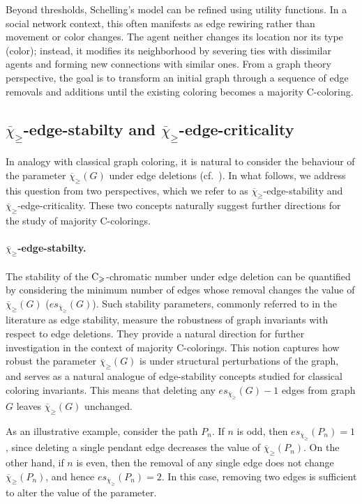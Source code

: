 \documentclass{article}
\theoremstyle{definition}
\newcommand{\mc}{\overline{\chi}_{\geqslant}}
\newcommand{\cg}{{\rm C}_{\geqslant}}
\begin{document}
    Beyond thresholds, Schelling's model can be refined using utility functions. In a social network context, this often manifests as edge rewiring rather than movement or color changes.
The agent neither changes its location nor its type (color); instead, it modifies its neighborhood by severing ties with dissimilar agents and forming new connections with similar ones. 
From a graph theory perspective, the goal is to transform an initial graph through a sequence of edge removals and additions until the existing coloring becomes a majority C-coloring.


\subsection{$\mc$-edge-stabilty and $\mc$-edge-criticality }
In analogy with classical graph coloring, it is natural to consider the behaviour of the parameter $\mc(G)$ under edge deletions (cf.~\cite{edge-stab}). In what follows, we address this question from two perspectives, which we refer to as $\mc$-edge-stability and $\mc$-edge-criticality. These two concepts naturally suggest further directions for the study of majority C-colorings.

\paragraph{$\mc$-edge-stabilty.} The stability of the $\cg$-chromatic number under edge deletion can be quantified by considering the minimum number of edges whose removal changes the value of $\mc(G)$ ($es_{\mc}(G)$). Such stability parameters, commonly referred to in the literature as edge stability, measure the robustness of graph invariants with respect to edge deletions. They provide a natural direction for further investigation in the context of majority C-colorings. 
This notion captures how robust the parameter 
$\mc(G)$
is under structural perturbations of the graph, and serves as a natural analogue of edge-stability concepts studied for classical coloring invariants. This means that deleting any $es_{\mc}(G)-1$ edges from graph $G$ leaves $\mc(G)$ unchanged.

As an illustrative example, consider the path $P_n$. If $n$ is odd, then $es_{\mc}(P_n)=1$, since deleting a single pendant edge decreases the value of $\mc(P_n)$. 
On the other hand, if $n$ is even, then the removal of any single edge does not change $\mc(P_n)$, and hence $es_{\mc}(P_n)=2$. In this case, removing two edges is sufficient to alter the value of the parameter.
\end{document}
